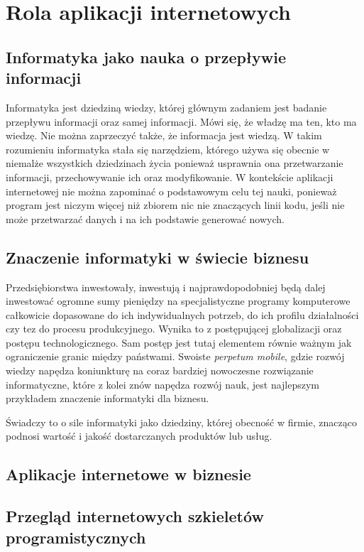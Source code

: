 \chapter{Rola aplikacji internetowych}
\label{chaper:web_app_purpose}

\section{Informatyka jako nauka o przepływie informacji}
	Informatyka jest dziedziną wiedzy, której głównym zadaniem jest badanie przepływu informacji oraz samej informacji. 
	Mówi się, że władzę ma ten, kto ma wiedzę. Nie można zaprzeczyć także, że informacja jest wiedzą. W takim rozumieniu
	informatyka stała się narzędziem, którego używa się obecnie w niemalże wszystkich dziedzinach życia ponieważ usprawnia
	ona przetwarzanie informacji, przechowywanie ich oraz modyfikowanie. 
	W kontekście aplikacji internetowej nie można zapominać o podstawowym celu tej nauki, ponieważ program jest niczym 
	więcej niż zbiorem nic nie znaczących linii kodu, jeśli nie może przetwarzać danych i na ich podstawie generować nowych.
\section{Znaczenie informatyki w świecie biznesu}
	Przedsiębiorstwa inwestowały, inwestują i najprawdopodobniej będą dalej inwestować ogromne sumy pieniędzy na specjalistyczne programy 
	komputerowe całkowicie dopasowane do ich indywidualnych potrzeb, do ich profilu działalności czy tez do procesu produkcyjnego.
	Wynika to z postępującej globalizacji oraz postępu technologicznego. Sam postęp jest tutaj elementem równie ważnym jak ograniczenie 
	granic między państwami. Swoiste \textit{perpetum mobile}, gdzie rozwój wiedzy napędza koniunkturę na coraz bardziej nowoczesne 
	rozwiązanie informatyczne, które z kolei znów napędza rozwój nauk, jest najlepszym przykładem znaczenie informatyki dla biznesu. 
		
	Świadczy to	o sile informatyki jako dziedziny, której obecność w firmie, znacząco podnosi wartość i jakość dostarczanych produktów lub usług. 
\section{Aplikacje internetowe w biznesie}
\section{Przegląd internetowych szkieletów programistycznych}